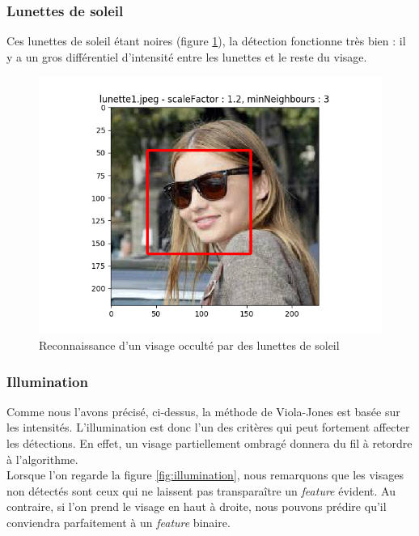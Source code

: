 \documentclass[a4paper,11pt]{article}
\begin{document}
	\subsubsection{Lunettes de soleil}

	    Ces lunettes de soleil étant noires (figure \ref{fig:lunette}), la détection fonctionne
	    très bien : il y a un gros
	    différentiel d'intensité entre les lunettes et le reste du visage.

	    \begin{figure}[H]
	        \begin{center}
		   \includegraphics[scale = 0.6]{images/lunette1_1,2_3.png}
		   \caption{Reconnaissance d'un visage occulté par des lunettes de soleil}
		   \label{fig:lunette}
	        \end{center}
	    \end{figure}
	
	\subsubsection{Illumination}

	    Comme nous l'avons précisé, ci-dessus, la méthode de Viola-Jones est basée sur les
	    intensités. L'illumination est donc l'un des critères qui peut fortement affecter les
	    détections. En effet, un visage partiellement ombragé donnera du fil à retordre à
	    l'algorithme. \\

	    Lorsque l'on regarde la figure \ref{fig:illumination}, nous remarquons que les visages
	    non détectés sont ceux qui ne laissent pas transparaître un \textit{feature} évident. Au
	    contraire, si l'on prend le visage en haut à droite, nous pouvons prédire qu'il
	    conviendra parfaitement à un \textit{feature} binaire.
\end{document}
